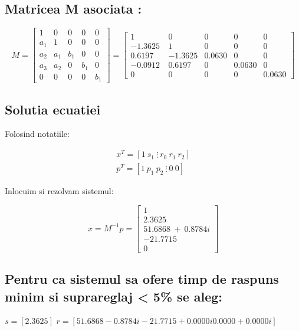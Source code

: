 \documentclass[12pt,english]{article}
\begin{document}
\subsection {Matricea M asociata : }
\begin{center}
  \begin{equation*}
  M=\begin{bmatrix}
  1 & 0 & 0 & 0 & 0\\
  a_{1} & 1 & 0 & 0 & 0\\
  a_{2} & a_{1} & b_{1} & 0 & 0\\
  a_{3} & a_{2} & 0 & b_{1} & 0\\
  0 & 0 & 0 & 0 & b_{1}
  \end{bmatrix} =\begin{bmatrix}
  1 & 0 & 0 & 0 & 0\\
  -1.3625\  & 1 & 0 & 0 & 0\\
  0.6197 & -1.3625 & 0.0630 & 0 & 0\\
  -0.0912 & 0.6197 & 0 & 0.0630 & 0\\
  0 & 0 & 0 & 0 & 0.0630
  \end{bmatrix}
  \end{equation*}
\end{center}

\subsection {Solutia ecuatiei}
Folosind notatiile:
\begin{center}
  \begin{gather*}
  x^{T} =[ 1\ s_{1} \ \vdots \ r_{0} \ r_{1} \ r_{2}]\\
  p^{T} =[ 1\ p_{1} \ p_{2} \ \vdots \ 0 \ 0]
  \end{gather*}
\end{center}

Inlocuim si rezolvam sistemul:
\begin{center}
  \begin{equation*}
  x=M^{-1} p=\begin{bmatrix}
  1\\
  2.3625\\
  51.6868\ +\ 0.8784i\\
  -21.7715\ \\
  0
  \end{bmatrix}
  \end{equation*}
\end{center}

\subsection {Pentru ca sistemul sa ofere timp de raspuns minim si suprareglaj < 5\% se aleg:}
$s = [2.3625]$
$r = [51.6868 - 0.8784i -21.7715 + 0.0000i   0.0000 + 0.0000i]$
\end{document}
